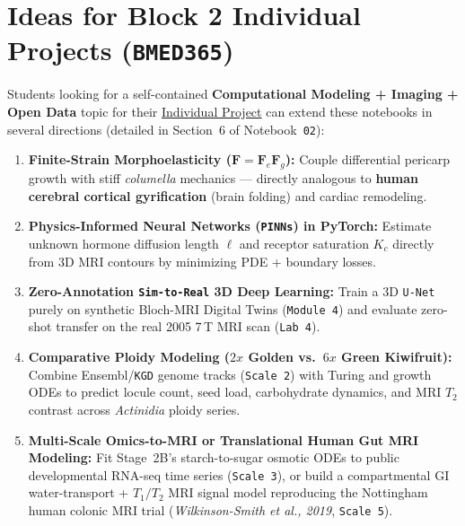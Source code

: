 \documentclass[10pt,a4paper]{article}
\newcommand{\ghblob}{https://github.com/arvidl/BMED365-2027/blob/main}
\begin{document}
\section{Ideas for Block 2 Individual Projects (\texorpdfstring{\texttt{BMED365}}{BMED365})}

Students looking for a self-contained \textbf{Computational Modeling + Imaging + Open Data} topic for their \href{\ghblob/Individual-project/README.md}{Individual Project} can extend these notebooks in several directions (detailed in Section~6 of Notebook~\texttt{02}):

\begin{enumerate}
    \item \textbf{Finite-Strain Morphoelasticity ($\mathbf{F} = \mathbf{F}_e\mathbf{F}_g$):} Couple differential pericarp growth with stiff \textit{columella} mechanics --- directly analogous to \textbf{human cerebral cortical gyrification} (brain folding) and cardiac remodeling.
    \item \textbf{Physics-Informed Neural Networks (\texttt{PINNs}) in PyTorch:} Estimate unknown hormone diffusion length $\ell$ and receptor saturation $K_c$ directly from 3D MRI contours by minimizing PDE + boundary losses.
    \item \textbf{Zero-Annotation \texttt{Sim-to-Real} 3D Deep Learning:} Train a 3D \texttt{U-Net} purely on synthetic Bloch-MRI Digital Twins (\texttt{Module 4}) and evaluate zero-shot transfer on the real 2005 7\,T MRI scan (\texttt{Lab 4}).
    \item \textbf{Comparative Ploidy Modeling ($2x$ Golden vs.\ $6x$ Green Kiwifruit):} Combine Ensembl/\texttt{KGD} genome tracks (\texttt{Scale 2}) with Turing and growth ODEs to predict locule count, seed load, carbohydrate dynamics, and MRI $T_2$ contrast across \textit{Actinidia} ploidy series.
    \item \textbf{Multi-Scale Omics-to-MRI or Translational Human Gut MRI Modeling:} Fit Stage~2B's starch-to-sugar osmotic ODEs to public developmental RNA-seq time series (\texttt{Scale 3}), or build a compartmental GI water-transport + $T_1/T_2$ MRI signal model reproducing the Nottingham human colonic MRI trial (\textit{Wilkinson-Smith et al., 2019}, \texttt{Scale 5}).
\end{enumerate}
\end{document}
